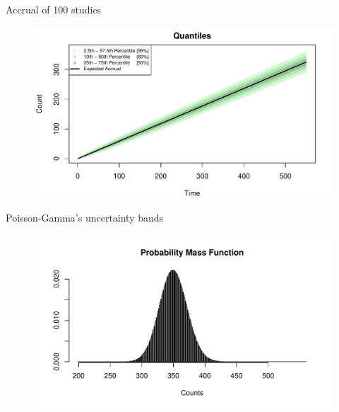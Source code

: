 \documentclass[english]{beamer}\usepackage[]{graphicx}\usepackage[]{xcolor}
\makeatletter
\def\maxwidth{ %
  \ifdim\Gin@nat@width>\linewidth
    \linewidth
  \else
    \Gin@nat@width
  \fi
}
\newenvironment{knitrout}{}{} %
\makeatother
\begin{document}
\begin{frame}{Accrual of 100 studies}

\begin{figure}
\begin{knitrout}
\color{fgcolor}
\includegraphics[width=\maxwidth]{figures/figunnamed-chunk-5-1} 
\end{knitrout}

\end{figure}

\end{frame}

\begin{frame}{Poisson-Gamma's uncertainty bands}
\begin{figure}
\begin{knitrout}
\color{fgcolor}
\includegraphics[width=\maxwidth]{figures/figunnamed-chunk-6-1} 
\end{knitrout}
\end{figure}
\end{frame}
\end{document}
